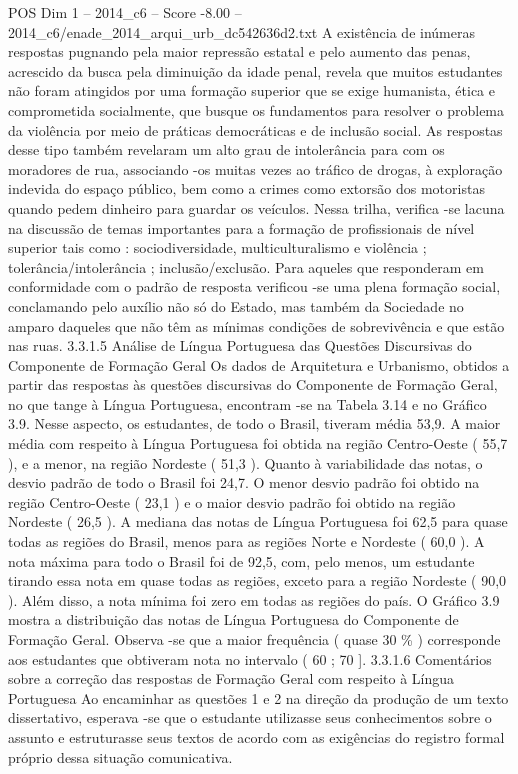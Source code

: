 \begin{textsample}{POS Dim 1 – 2014\_c6 – Score -8.00 – 2014\_c6/enade\_2014\_arqui\_urb\_dc542636d2.txt}
A existência de inúmeras respostas pugnando pela maior repressão estatal e pelo aumento das penas, acrescido da busca pela diminuição da idade penal, revela que muitos estudantes não foram atingidos por uma formação superior que se exige humanista, ética e comprometida socialmente, que busque os fundamentos para resolver o problema da violência por meio de práticas democráticas e de inclusão social.
As respostas desse tipo também revelaram um alto grau de intolerância para com os moradores de rua, associando -os muitas vezes ao tráfico de drogas, à exploração indevida do espaço público, bem como a crimes como extorsão dos motoristas quando pedem dinheiro para guardar os veículos.
Nessa trilha, verifica -se lacuna na discussão de temas importantes para a formação de profissionais de nível superior tais como : sociodiversidade, multiculturalismo e violência ; tolerância/intolerância ; inclusão/exclusão.
Para aqueles que responderam em conformidade com o padrão de resposta verificou -se uma plena formação social, conclamando pelo auxílio não só do Estado, mas também da Sociedade no amparo daqueles que não têm as mínimas condições de sobrevivência e que estão nas ruas. 3.3.1.5 Análise de Língua Portuguesa das Questões Discursivas do Componente de Formação Geral Os dados de Arquitetura e Urbanismo, obtidos a partir das respostas às questões discursivas do Componente de Formação Geral, no que tange à Língua Portuguesa, encontram -se na Tabela 3.14 e no Gráfico 3.9.
Nesse aspecto, os estudantes, de todo o Brasil, tiveram média 53,9.
A maior média com respeito à Língua Portuguesa foi obtida na região Centro-Oeste ( 55,7 ), e a menor, na região Nordeste ( 51,3 ).
Quanto à variabilidade das notas, o desvio padrão de todo o Brasil foi 24,7.
O menor desvio padrão foi obtido na região Centro-Oeste ( 23,1 ) e o maior desvio padrão foi obtido na região Nordeste ( 26,5 ).
A mediana das notas de Língua Portuguesa foi 62,5 para quase todas as regiões do Brasil, menos para as regiões Norte e Nordeste ( 60,0 ).
A nota máxima para todo o Brasil foi de 92,5, com, pelo menos, um estudante tirando essa nota em quase todas as regiões, exceto para a região Nordeste ( 90,0 ).
Além disso, a nota mínima foi zero em todas as regiões do país.
O Gráfico 3.9 mostra a distribuição das notas de Língua Portuguesa do Componente de Formação Geral.
Observa -se que a maior frequência ( quase 30 \% ) corresponde aos estudantes que obtiveram nota no intervalo ( 60 ; 70 ]. 3.3.1.6 Comentários sobre a correção das respostas de Formação Geral com respeito à Língua Portuguesa Ao encaminhar as questões 1 e 2 na direção da produção de um texto dissertativo, esperava -se que o estudante utilizasse seus conhecimentos sobre o assunto e estruturasse seus textos de acordo com as exigências do registro formal próprio dessa situação comunicativa.

\end{textsample}
